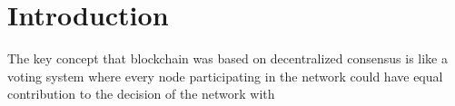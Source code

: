 \documentclass[sigconf, nonacm, natbib=false]{acmart}
\begin{document}

\section{Introduction}
The key concept that blockchain was based on decentralized consensus is like a voting system where every node participating in the network could have equal contribution to the decision of the network with 
\end{document}
